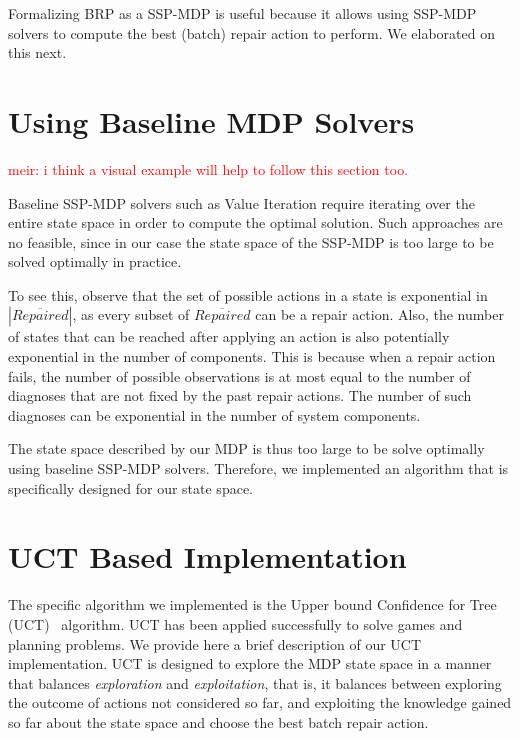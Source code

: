 \documentclass[a4paper,11pt]{report}
\newcommand\meir[1]{\textcolor{red}{meir: #1}}
\newcommand\roni[1]{\textcolor{green}{roni: #1}}
\begin{document}
 
 Formalizing BRP as a SSP-MDP is useful because it allows using SSP-MDP solvers to compute the best (batch) repair action to perform. We elaborated on this next. 
 
\section{Using Baseline MDP Solvers}
\meir{i think a visual example will help to follow this section too.}

Baseline SSP-MDP solvers such as Value Iteration require iterating over the entire state space in order to compute the optimal solution. 
Such approaches are no feasible, since in our case the state space of the SSP-MDP is too large to be solved optimally in practice. 

To see this, observe that the set of possible actions in a state is exponential in $|\overline{Repaired}|$, as every subset of $\overline{Repaired}$ can be a repair action. Also, the number of states that can be reached after applying an action is also potentially exponential in the number of components. This is because when a repair action fails, the number of possible observations is at most equal to the number of diagnoses that are not fixed by the past repair actions. The number of such diagnoses can be exponential in the number of system components.

The state space described by our MDP is thus too large to be solve optimally using baseline SSP-MDP solvers. 
Therefore, we implemented an algorithm that is specifically designed for our state space.



\section{UCT Based Implementation}
The specific algorithm we implemented is the Upper bound Confidence for Tree (UCT)~\cite{kocsis2006bandit} algorithm. UCT has been applied successfully to solve  games and planning problems. We provide here a brief description of our UCT implementation. 
UCT is designed to explore the MDP state space in a manner that balances \emph{exploration} and \emph{exploitation}, that is, it balances between exploring the outcome of actions not considered so far, and exploiting the knowledge gained so far about the state space and choose the best batch repair action. 
\end{document}

